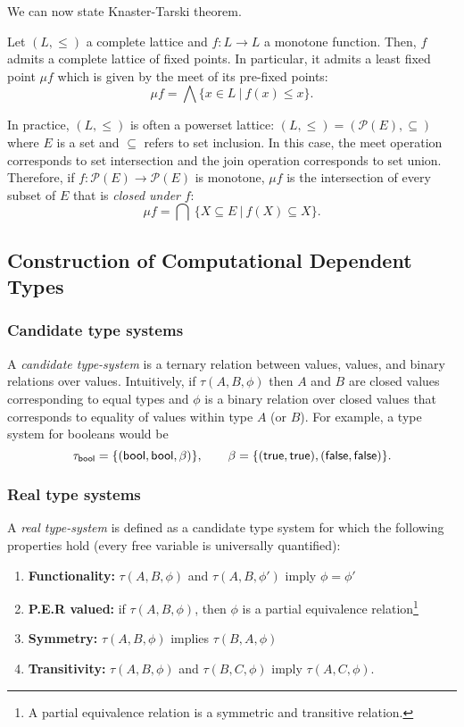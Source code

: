 \documentclass{article} \usepackage{chtt-notes} \usepackage{stmaryrd}
\begin{document}
We can now state Knaster-Tarski theorem.

\begin{theorem*}
  Let $(L, \leq)$ a complete lattice and $f : L \to L$ a monotone
  function.  Then, $f$ admits a complete lattice of fixed points. In
  particular, it admits a least fixed point $\mu f$ which is given by
  the meet of its pre-fixed points:
  \[ \mu f = \bigwedge \{ x \in L \ |\ f(x) \leq x\}.\]
\end{theorem*}

In practice, $(L, \leq)$ is often a powerset lattice:
$(L, \leq) = (\mathcal{P}(E), \subseteq)$ where $E$ is a set and
$\subseteq$ refers to set inclusion. In this case, the meet operation
corresponds to set intersection and the join operation corresponds to
set union. Therefore, if $f : \mathcal{P}(E) \to \mathcal{P}(E)$ is
monotone, $\mu f$ is the intersection of every subset of $E$ that is
\emph{closed under} $f$:
\[ \mu f = \bigcap \ \{ X \subseteq E \ | \ f(X) \subseteq X \}. \]


\subsection{Construction of Computational Dependent Types}

\subsubsection{Candidate type systems}

A \emph{candidate type-system} is a ternary relation between values,
values, and binary relations over values.  Intuitively, if
$\tau(A, B, \phi)$ then $A$ and $B$ are closed values corresponding to
equal types and $\phi$ is a binary relation over closed values that
corresponds to equality of values within type $A$ (or $B$).  For
example, a type system for booleans would be
\[\tau_{\mathsf{bool}} = \{(\mathsf{bool}, \mathsf{bool}, \beta)\}, \qquad
  \beta = \{(\mathsf{true}, \mathsf{true}), (\mathsf{false}, \mathsf{false})\}.\]

\subsubsection{Real type systems}
A \emph{real type-system} is defined as a candidate type system for
which the following properties hold (every free variable is
universally quantified):
\begin{enumerate}
\item \textbf{Functionality:} $\tau(A, B, \phi)$ and
  $\tau(A, B, \phi')$ imply $\phi = \phi'$
\item \textbf{\textsc{P.E.R} valued:} if $\tau(A, B, \phi)$, then
  $\phi$ is a partial equivalence relation\footnote{A partial
    equivalence relation is a symmetric and transitive relation.}
\item \textbf{Symmetry:} $\tau(A, B, \phi)$ implies $\tau(B, A, \phi)$
\item \textbf{Transitivity:} $\tau(A, B, \phi)$ and $\tau(B, C, \phi)$
  imply $\tau(A, C, \phi)$.
\end{enumerate}
\end{document}
